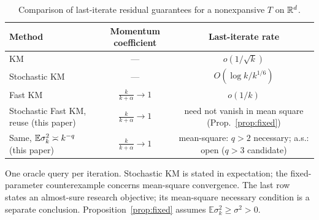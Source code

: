 \documentclass[10pt,draft]{article}
\numberwithin{equation}{section}
\theoremstyle{definition}
\theoremstyle{remark}
\begin{document}
\begin{table}[t]
\centering
\caption{Comparison of last-iterate residual guarantees for a nonexpansive $T$
on $\mathbb{R}^d$.}
\label{tab:rates}
\small
\begin{tabularx}{\textwidth}{@{}>{\raggedright\arraybackslash}Xcc@{}}
\toprule
Method & Momentum coefficient & Last-iterate rate \\
\midrule
KM \cite{bot2023fast} & --- & $o(1/\sqrt{k})$ \\
Stochastic KM \cite{bravo2024stochastic} & ---
 & $O(\log k/k^{1/6})$ \\
Fast KM \cite{bot2023fast} & $\frac{k}{k+\alpha}\to1$ & $o(1/k)$ \\
\midrule
Stochastic Fast KM, reuse (this paper) & $\frac{k}{k+\alpha}\to1$
 & need not vanish in mean square (Prop.~\ref{prop:fixed}) \\
Same, $\mathbb{E}\sigma_k^2\asymp k^{-q}$ (this paper) & $\frac{k}{k+\alpha}\to1$
 & mean-square: $q>2$ necessary; a.s.: open ($q>3$ candidate) \\
\bottomrule
\end{tabularx}

\smallskip
\raggedright\footnotesize
One oracle query per iteration. Stochastic KM is stated in expectation;
the fixed-parameter counterexample concerns mean-square convergence.
The last row states an almost-sure research objective; its mean-square
necessary condition is a separate conclusion. Proposition~\ref{prop:fixed}
assumes $\mathbb E\sigma_k^2\geq\sigma^2>0$.
\end{table}

\end{document}
